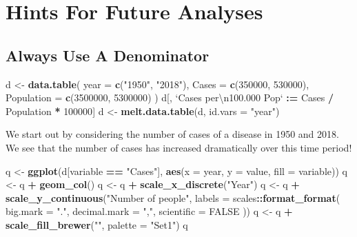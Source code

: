 \documentclass[]{book}
\newenvironment{Shaded}{\begin{snugshade}}{\end{snugshade}}
\newcommand{\KeywordTok}[1]{\textcolor[rgb]{0.13,0.29,0.53}{\textbf{#1}}}
\newcommand{\DataTypeTok}[1]{\textcolor[rgb]{0.13,0.29,0.53}{#1}}
\newcommand{\DecValTok}[1]{\textcolor[rgb]{0.00,0.00,0.81}{#1}}
\newcommand{\CharTok}[1]{\textcolor[rgb]{0.31,0.60,0.02}{#1}}
\newcommand{\StringTok}[1]{\textcolor[rgb]{0.31,0.60,0.02}{#1}}
\newcommand{\OtherTok}[1]{\textcolor[rgb]{0.56,0.35,0.01}{#1}}
\newcommand{\OperatorTok}[1]{\textcolor[rgb]{0.81,0.36,0.00}{\textbf{#1}}}
\newcommand{\ErrorTok}[1]{\textcolor[rgb]{0.64,0.00,0.00}{\textbf{#1}}}
\newcommand{\NormalTok}[1]{#1}
\begin{document}
\section{Hints For Future Analyses}\label{hints-for-future-analyses}

\subsection{Always Use A Denominator}\label{always-use-a-denominator}

\begin{Shaded}
\begin{Highlighting}[]
\NormalTok{d <-}\StringTok{ }\KeywordTok{data.table}\NormalTok{(}
  \DataTypeTok{year =} \KeywordTok{c}\NormalTok{(}\StringTok{"1950"}\NormalTok{, }\StringTok{"2018"}\NormalTok{),}
  \DataTypeTok{Cases =} \KeywordTok{c}\NormalTok{(}\DecValTok{350000}\NormalTok{, }\DecValTok{530000}\NormalTok{),}
  \DataTypeTok{Population =} \KeywordTok{c}\NormalTok{(}\DecValTok{3500000}\NormalTok{, }\DecValTok{5300000}\NormalTok{)}
\NormalTok{)}
\NormalTok{d[, }\StringTok{`}\DataTypeTok{Cases per}\CharTok{\textbackslash{}n}\DataTypeTok{100.000 Pop}\StringTok{`} \OperatorTok{:}\ErrorTok{=}\StringTok{ }\NormalTok{Cases }\OperatorTok{/}\StringTok{ }\NormalTok{Population }\OperatorTok{*}\StringTok{ }\DecValTok{100000}\NormalTok{]}
\NormalTok{d <-}\StringTok{ }\KeywordTok{melt.data.table}\NormalTok{(d, }\DataTypeTok{id.vars =} \StringTok{"year"}\NormalTok{)}
\end{Highlighting}
\end{Shaded}

We start out by considering the number of cases of a disease in 1950 and
2018. We see that the number of cases has increased dramatically over
this time period!

\begin{Shaded}
\begin{Highlighting}[]
\NormalTok{q <-}\StringTok{ }\KeywordTok{ggplot}\NormalTok{(d[variable }\OperatorTok{==}\StringTok{ "Cases"}\NormalTok{], }\KeywordTok{aes}\NormalTok{(}\DataTypeTok{x =}\NormalTok{ year, }\DataTypeTok{y =}\NormalTok{ value, }\DataTypeTok{fill =}\NormalTok{ variable))}
\NormalTok{q <-}\StringTok{ }\NormalTok{q }\OperatorTok{+}\StringTok{ }\KeywordTok{geom_col}\NormalTok{()}
\NormalTok{q <-}\StringTok{ }\NormalTok{q }\OperatorTok{+}\StringTok{ }\KeywordTok{scale_x_discrete}\NormalTok{(}\StringTok{"Year"}\NormalTok{)}
\NormalTok{q <-}\StringTok{ }\NormalTok{q }\OperatorTok{+}\StringTok{ }\KeywordTok{scale_y_continuous}\NormalTok{(}\StringTok{"Number of people"}\NormalTok{, }\DataTypeTok{labels =}\NormalTok{ scales}\OperatorTok{::}\KeywordTok{format_format}\NormalTok{(}
  \DataTypeTok{big.mark =} \StringTok{"."}\NormalTok{,}
  \DataTypeTok{decimal.mark =} \StringTok{","}\NormalTok{,}
  \DataTypeTok{scientific =} \OtherTok{FALSE}
\NormalTok{))}
\NormalTok{q <-}\StringTok{ }\NormalTok{q }\OperatorTok{+}\StringTok{ }\KeywordTok{scale_fill_brewer}\NormalTok{(}\StringTok{""}\NormalTok{, }\DataTypeTok{palette =} \StringTok{"Set1"}\NormalTok{)}
\NormalTok{q}
\end{Highlighting}
\end{Shaded}
\end{document}
